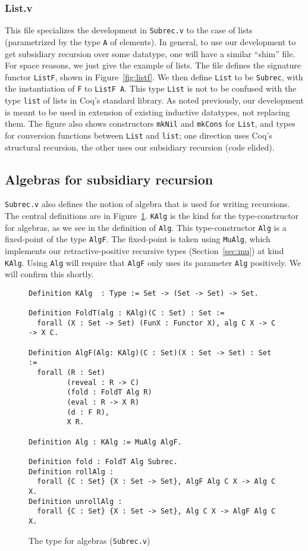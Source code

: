 \documentclass[a4paper,USenglish]{lipics-v2021}
\begin{document}
  \subsubsection{List.v}

  This file specializes the development in \verb|Subrec.v| to the case
  of lists (parametrized by the type \verb|A| of elements).  In
  general, to use our development to get subsidiary recursion over
  some datatype, one will have a similar ``shim'' file.  For space
  reasons, we just give the example of lists.  The file defines the
  signature functor \verb|ListF|, shown in Figure~\ref{fig:listf}.  We
  then define \verb|List| to be \verb|Subrec|, with the instantiation
  of \verb|F| to \verb|ListF A|.  This type \verb|List| is not to be
  confused with the type \verb|list| of lists in Coq's standard
  library.  As noted previously, our development is meant to be used
  in extension of existing inductive datatypes, not replacing them.
  The figure also shows constructors \verb|mkNil| and \verb|mkCons|
  for \verb|List|, and types for conversion functions between
  \verb|List| and \verb|list|; one direction uses Coq's structural
  recursion, the other uses our subsidiary recursion (code elided).
  

\subsection{Algebras for subsidiary recursion}

\verb|Subrec.v| also defines the notion of algebra that is used for
writing recursions.  The central definitions are in
Figure~\ref{fig:algf}.  \verb|KAlg| is the kind for the
type-constructor for algebras, as we see in the definition of
\verb|Alg|.  This type-constructor \verb|Alg| is a fixed-point of the
type \verb|AlgF|.  The fixed-point is taken using \verb|MuAlg|, which
implements our retractive-positive recursive types
(Section~\ref{sec:mu}) at kind \verb|KAlg|.  Using \verb|Alg| will
require that \verb|AlgF| only uses its parameter \verb|Alg|
positively.  We will confirm this shortly.

\begin{figure}
\begin{verbatim}
Definition KAlg  : Type := Set -> (Set -> Set) -> Set.

Definition FoldT(alg : KAlg)(C : Set) : Set :=
  forall (X : Set -> Set) (FunX : Functor X), alg C X -> C -> X C.

Definition AlgF(Alg: KAlg)(C : Set)(X : Set -> Set) : Set :=
  forall (R : Set)
         (reveal : R -> C)        
         (fold : FoldT Alg R)
         (eval : R -> X R)      
         (d : F R),             
         X R.

Definition Alg : KAlg := MuAlg AlgF.

Definition fold : FoldT Alg Subrec.
Definition rollAlg :
  forall {C : Set} {X : Set -> Set}, AlgF Alg C X -> Alg C X.
Definition unrollAlg : 
  forall {C : Set} {X : Set -> Set}, Alg C X -> AlgF Alg C X.
\end{verbatim}
\caption{The type for algebras (\texttt{Subrec.v})}
\label{fig:algf}
\end{figure}
\end{document}
